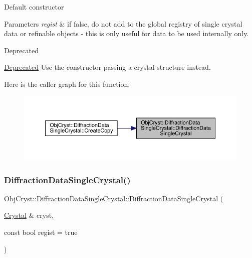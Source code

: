 Default constructor


\begin{DoxyParams}{Parameters}
{\em regist} & if false, do not add to the global registry of single crystal data or refinable objects -\/ this is only useful for data to be used internally only.\\
\hline
\end{DoxyParams}
\begin{DoxyRefDesc}{Deprecated}
\item[\mbox{\hyperlink{deprecated__deprecated000001}{Deprecated}}]Use the constructor passing a crystal structure instead. \end{DoxyRefDesc}
Here is the caller graph for this function\+:
\nopagebreak
\begin{figure}[H]
\begin{center}
\leavevmode
\includegraphics[width=350pt]{class_obj_cryst_1_1_diffraction_data_single_crystal_ab182bcffdd5cded6e7bd536bc71a3241_icgraph}
\end{center}
\end{figure}
\mbox{\label{class_obj_cryst_1_1_diffraction_data_single_crystal_a3fcfa9d8f263043025d4167001c2243f}} 
\subsubsection{\texorpdfstring{DiffractionDataSingleCrystal()}{DiffractionDataSingleCrystal()}\hspace{0.1cm}{\footnotesize\ttfamily [2/2]}}
{\footnotesize\ttfamily Obj\+Cryst\+::\+Diffraction\+Data\+Single\+Crystal\+::\+Diffraction\+Data\+Single\+Crystal (\begin{DoxyParamCaption}\item[{\mbox{\hyperlink{class_obj_cryst_1_1_crystal}{Crystal}} \&}]{cryst,  }\item[{const bool}]{regist = {\ttfamily true} }\end{DoxyParamCaption})}

